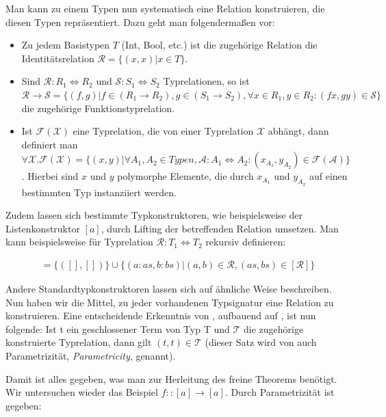 Man kann zu einem Typen nun systematisch eine Relation konstruieren, die diesen Typen repräsentiert. Dazu geht man
folgendermaßen vor:

\begin{itemize}
\item Zu jedem Basistypen $T$ (Int, Bool, etc.) ist die zugehörige Relation die Identitätsrelation $\mathcal{R} = \{ (x, x) | x \in T\}$.
\item Sind $\mathcal{R} : R_1 \Leftrightarrow R_2$ und $\mathcal{S} : S_1 \Leftrightarrow S_2$ Typrelationen, so ist $\mathcal{R} \rightarrow \mathcal{S} = \{ (f, g) | f \in (R_1 \rightarrow R_2), g \in (S_1 \rightarrow S_2), \forall x \in R_1, y \in R_2: (f x, g y) \in \mathcal{S} \}$ die zugehörige Funktionstyprelation.
\item Ist $\mathcal{F}(\mathcal{X})$ eine Typrelation, die von einer Typrelation $\mathcal{X}$ abhängt, dann definiert man
$\forall \mathcal{X} . \mathcal{F}(\mathcal{X}) = \{ (x, y) | \forall A_1, A_2 \in Typen, \mathcal{A} : A_1 \Leftrightarrow A_2: 
(x_{A_1}, y_{A_2}) \in \mathcal{F}(\mathcal{A}) \}$. Hierbei sind $x$ und $y$ polymorphe Elemente, die durch $x_{A_1}$ und $y_{A_2}$
auf einen bestimmten Typ instanziiert werden.
\end{itemize}

Zudem lassen sich bestimmte Typkonstruktoren, wie beispielsweise der Listenkonstruktor $[a]$, durch Lifting der betreffenden
Relation umsetzen. Man kann beispielsweise für Typrelation $\mathcal{R} : T_1 \Leftrightarrow T_2$ rekursiv definieren:

\begin{align}
[\mathcal{R}] = \{ ([], []) \} \cup \{ (a : as, b : bs) | (a, b) \in \mathcal{R}, (as, bs) \in [\mathcal{R}] \}
\end{align}

Andere Standardtypkonstruktoren lassen sich auf ähnliche Weise beschreiben. Nun haben wir die Mittel, zu jeder vorhandenen
Typsignatur eine Relation zu konstruieren. Eine entscheidende Erkenntnis von \cite{wadler}, aufbauend auf
\cite{reynolds}, ist nun folgende: Ist t ein geschlossener Term von Typ T und $\mathcal{T}$ die zugehörige konstruierte
Typrelation, dann gilt $(t, t) \in \mathcal{T}$ (dieser Satz wird von \cite{wadler} auch Parametrizität, \textit{Parametricity}, genannt).

Damit ist alles gegeben, was man zur Herleitung des freine Theorems benötigt. Wir untersuchen wieder das Beispiel
$f :: [a] \rightarrow [a]$. Durch Parametrizität ist gegeben:

